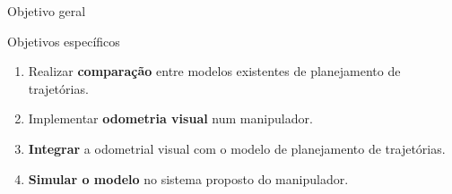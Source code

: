 \begin{frame}[c]{Objetivo geral}

\end{frame}
\begin{frame}[c]{Objetivos específicos}
    \centering
    \begin{enumerate}
        \item Realizar \textbf{comparação} entre modelos existentes de planejamento de trajetórias.
        \item Implementar \textbf{odometria visual} num manipulador.
        \item \textbf{Integrar} a odometrial visual com o modelo de planejamento de trajetórias.
        \item \textbf{Simular o modelo} no sistema proposto do manipulador.
    \end{enumerate}
\end{frame}
